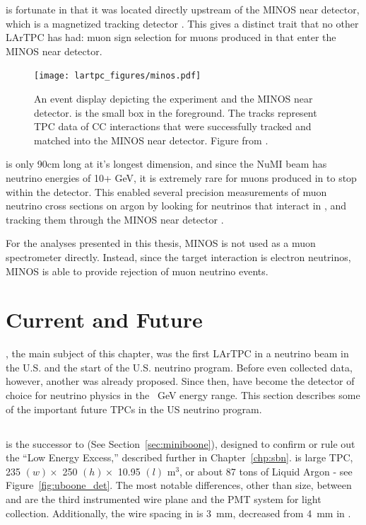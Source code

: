 \argoneut is fortunate in that it was located directly upstream of the MINOS near detector, which is a magnetized tracking detector \cite{MINOS}.  This gives \argoneut a distinct trait that no other LArTPC has had: muon sign selection for muons produced in \argoneut that enter the MINOS near detector.

\begin{figure}[htb]
  \centering
  \texttt{[image: lartpc\_figures/minos.pdf]}
  \caption[\argoneut and MINOS]{An event display depicting the \argoneut experiment and the MINOS near detector. \argoneut is the small box in the foreground.  The tracks represent TPC data of \numu CC interactions that were successfully tracked and matched into the MINOS near detector.  Figure from \cite{Anderson:2012vc}.}
  \label{fig:minos}
\end{figure}

\argoneut is only 90cm long at it's longest dimension, and since the NuMI beam has neutrino energies of 10+ GeV, it is extremely rare for muons produced in \argoneut to stop within the detector.  This enabled several precision measurements of muon neutrino cross sections on argon by looking for neutrinos that interact in \argoneut, and tracking them through the MINOS near detector \cite{Anderson:2011ce, Acciarri:2014isz}.

For the analyses presented in this thesis, MINOS is not used as a muon spectrometer directly.  Instead, since the target interaction is electron neutrinos, MINOS is able to provide rejection of muon neutrino events.

\section{Current and Future \lartpcs}

\argoneut, the main subject of this chapter, was the first LArTPC in a neutrino beam in the U.S. and the start of the U.S. \lartpc neutrino program.  Before \argoneut even collected data, however, another \lartpc was already proposed.  Since then, \lartpcs have become the detector of choice for neutrino physics in the ~GeV energy range.  This section describes some of the important future TPCs in the US neutrino program. 

\subsection{\label{sec:microboone} \uboone}

\uboone is the successor to \MB \cite{miniboone} (See Section~\ref{sec:miniboone}), designed to confirm or rule out the \MB ``Low Energy Excess,'' described further in Chapter~\ref{chp:sbn}.  \uboone is large TPC, 235 $ (w) \times $ 250 $ (h) \times $ 10.95 $ (l) $ m$^3$, or about 87 tons of Liquid Argon - see Figure~\ref{fig:uboone_det}.  The most notable differences, other than size, between \argoneut and \uboone are the third instrumented wire plane and the PMT system for light collection.  Additionally, the wire spacing in \uboone is 3~mm, decreased from 4~mm in \argoneut.

